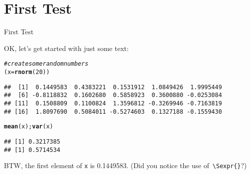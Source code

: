 \documentclass[10pt]{beamer}\usepackage[]{graphicx}\usepackage[]{color}
\makeatletter
\newcommand{\hlnum}[1]{\textcolor[rgb]{0.686,0.059,0.569}{#1}}%
\newcommand{\hlcom}[1]{\textcolor[rgb]{0.678,0.584,0.686}{\textit{#1}}}%
\newcommand{\hlstd}[1]{\textcolor[rgb]{0.345,0.345,0.345}{#1}}%
\newcommand{\hlkwb}[1]{\textcolor[rgb]{0.69,0.353,0.396}{#1}}%
\newcommand{\hlkwd}[1]{\textcolor[rgb]{0.737,0.353,0.396}{\textbf{#1}}}%
\newenvironment{kframe}{%
 \def\at@end@of@kframe{}%
 \ifinner\ifhmode%
  \def\at@end@of@kframe{\end{minipage}}%
  \begin{minipage}{\columnwidth}%
 \fi\fi%
 \def\FrameCommand##1{\hskip\@totalleftmargin \hskip-\fboxsep
 \colorbox{shadecolor}{##1}\hskip-\fboxsep
     \hskip-\linewidth \hskip-\@totalleftmargin \hskip\columnwidth}%
 \MakeFramed {\advance\hsize-\width
   \@totalleftmargin\z@ \linewidth\hsize
   \@setminipage}}%
 {\par\unskip\endMakeFramed%
 \at@end@of@kframe}
\newenvironment{knitrout}{}{} %
\makeatother
\begin{document}
\section{First Test}
\begin{frame}[fragile]{First Test}

OK, let's get started with just some text:



\begin{knitrout}\footnotesize
{}\color{fgcolor}\begin{kframe}
\begin{alltt}
\hlcom{# create some random numbers}
\hlstd{(x}\hlkwb{=}\hlkwd{rnorm}\hlstd{(}\hlnum{20}\hlstd{))}
\end{alltt}
\begin{verbatim}
##  [1]  0.1449583  0.4383221  0.1531912  1.0849426  1.9995449
##  [6] -0.8118832  0.1602680  0.5858923  0.3600880 -0.0253084
## [11]  0.1508809  0.1100824  1.3596812 -0.3269946 -0.7163819
## [16]  1.8097690  0.5084011 -0.5274603  0.1327188 -0.1559430
\end{verbatim}
\begin{alltt}
\hlkwd{mean}\hlstd{(x);}\hlkwd{var}\hlstd{(x)}
\end{alltt}
\begin{verbatim}
## [1] 0.3217385
## [1] 0.5714534
\end{verbatim}
\end{kframe}
\end{knitrout}

BTW, the first element of \texttt{x} is 0.1449583. (Did you notice
the use of\texttt{ \textbackslash{}Sexpr\{\}}?)
\end{frame}
\end{document}
